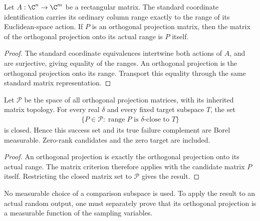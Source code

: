 \begin{theorem}
    \label{thm:projection_matrix_range}
    \leanok
    Let $A:\C^n\to\C^m$ be a rectangular matrix. The standard coordinate
    identification carries its ordinary column range exactly to the range
    of its Euclidean-space action. If $P$ is an orthogonal projection
    matrix, then the matrix of the orthogonal projection onto its actual
    range is $P$ itself.
\end{theorem}
\begin{proof}\leanok
    The standard coordinate equivalences intertwine both actions of $A$,
    and are surjective, giving equality of the ranges. An orthogonal
    projection is the orthogonal projection onto its range. Transport this
    equality through the same standard matrix representation.
\end{proof}

\begin{theorem}
    \label{thm:closed_closeness_success}
    \leanok
    Let $\mathcal P$ be the space of all orthogonal projection matrices,
    with its inherited matrix topology. For every real $\delta$ and
    every fixed target subspace $T$, the set
    \begin{align}
        \bigl\{P\in\mathcal P:
        \operatorname{range}P\text{ is }\delta\text{-close to }T\bigr\}
    \end{align}
    is closed. Hence this success set and its true failure complement
    are Borel measurable. Zero-rank candidates and the zero target are
    included.
\end{theorem}
\begin{proof}\leanok
    An orthogonal projection is exactly the orthogonal projection onto
    its actual range. The matrix criterion therefore applies with the
    candidate matrix $P$ itself. Restricting the closed matrix set to
    $\mathcal P$ gives the result.
\end{proof}

No measurable choice of a comparison subspace is used. To apply the result
to an actual random output, one must separately prove that its orthogonal
projection is a measurable function of the sampling variables.
